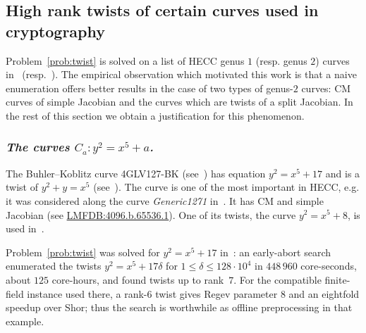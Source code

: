 \documentclass{amsart}
\begin{document}
\subsection{High rank twists of certain curves used in cryptography}\label{ssec:twist of split}

Problem~\ref{prob:twist} is solved on a list of HECC genus $1$ (resp. genus $2$) curves  in~\cite{BarbulescuBarcauPasol2025} (resp.~\cite{BarbulescuBisson2024}). The empirical observation which motivated this work is that a naive enumeration offers better results in the case of two types of genus-$2$ curves: CM curves of simple Jacobian and the curves which are twists of a split Jacobian. In the rest of this section we obtain a justification for this phenomenon. 


\subsubsection{\emph{The curves $C_a:y^2=x^5+a$.}}\label{sssec:x5}
The Buhler--Koblitz curve 4GLV127-BK  (see~\cite{BarbulescuBisson2024}) has equation $y^2=x^5+17$
 and is a twist of $y^2+y=x^5$ (see~\cite{Buhler1998}). The curve is one of the most important in HECC, e.g. it was considered along the curve \emph{Generic1271} in~\cite{Bos2014}. It has CM and simple Jacobian (see \href{https://www.lmfdb.org/Genus2Curve/Q/3125/a/3125/1}{LMFDB:4096.b.65536.1}). One of its twists, the curve $y^2=x^5+8$, is used in~\cite{Brown2005}.
 
 Problem~\ref{prob:twist} was solved for $y^2=x^5+17$
in~\cite{BarbulescuBisson2024}: an early-abort search enumerated the twists
$y^2=x^5+17\delta$ for $1\leq \delta\leq 128\cdot 10^4$ in
$448\,960$ core-seconds, about $125$ core-hours, and found twists up to
rank~$7$. For the compatible finite-field instance used there, a rank-$6$
twist gives Regev parameter $8$ and an eightfold speedup over Shor; thus the
search is worthwhile as offline preprocessing in that example.
 
\end{document}
